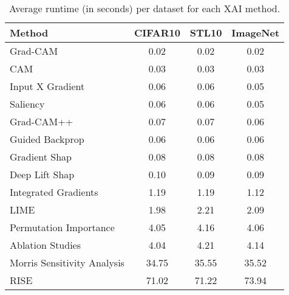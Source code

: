 \begin{table}[ht]
\centering
\begin{tabular}{lccc}
\toprule
Method & CIFAR10 & STL10 & ImageNet \\
\midrule
Grad-CAM & 0.02 & 0.02 & 0.02 \\
CAM & 0.03 & 0.03 & 0.03 \\
Input X Gradient & 0.06 & 0.06 & 0.05 \\
Saliency & 0.06 & 0.06 & 0.05 \\
Grad-CAM++ & 0.07 & 0.07 & 0.06 \\
Guided Backprop & 0.06 & 0.06 & 0.06 \\
Gradient Shap & 0.08 & 0.08 & 0.08 \\
Deep Lift Shap & 0.10 & 0.09 & 0.09 \\
Integrated Gradients & 1.19 & 1.19 & 1.12 \\
LIME & 1.98 & 2.21 & 2.09 \\
Permutation Importance & 4.05 & 4.16 & 4.06 \\
Ablation Studies & 4.04 & 4.21 & 4.14 \\
Morris Sensitivity Analysis & 34.75 & 35.55 & 35.52 \\
RISE & 71.02 & 71.22 & 73.94 \\
\bottomrule
\end{tabular}
\caption{Average runtime (in seconds) per dataset for each XAI method.}
\label{tab:runtime_by_dataset}
\end{table}
